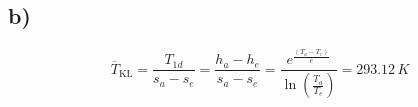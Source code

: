 

\subsection*{b)}

\begin{equation*}
\overline{T}_{\text{KL}} = \frac{T_{1d}}{s_{a} - s_{e}} = \frac{h_{a} - h_{e}}{s_{a} - s_{e}} = \frac{e^{\frac{(T_{a} - T_{e})}{e}}}{\ln \left( \frac{T_{a}}{T_{e}} \right)} = 293.12 \, K
\end{equation*}
